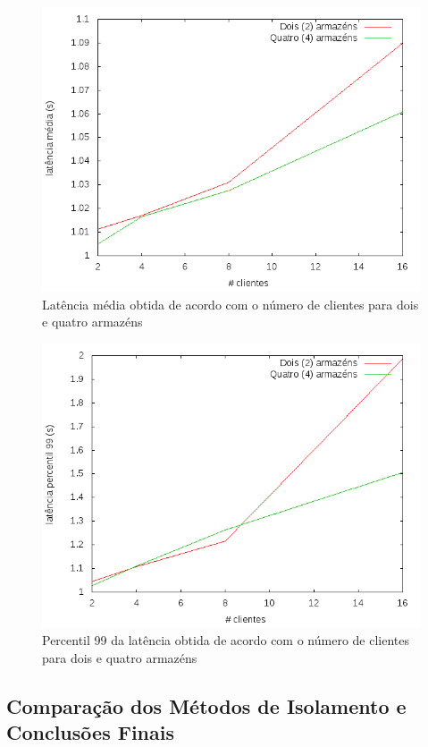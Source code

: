 \begin{figure}[!h]
\centering
\includegraphics[scale=.4]{img/questao-1/read-com-lat-med}
\caption{Latência média obtida de acordo com o número de clientes para dois e quatro armazéns}
\end{figure}


\begin{figure}[!h]
\centering
\includegraphics[scale=.4]{img/questao-1/read-com-lat-pct99}
\caption{Percentil 99 da latência obtida de acordo com o número de clientes para dois e quatro armazéns}
\end{figure}

\newpage
\subsection{Comparação dos Métodos de Isolamento e  Conclusões Finais}
